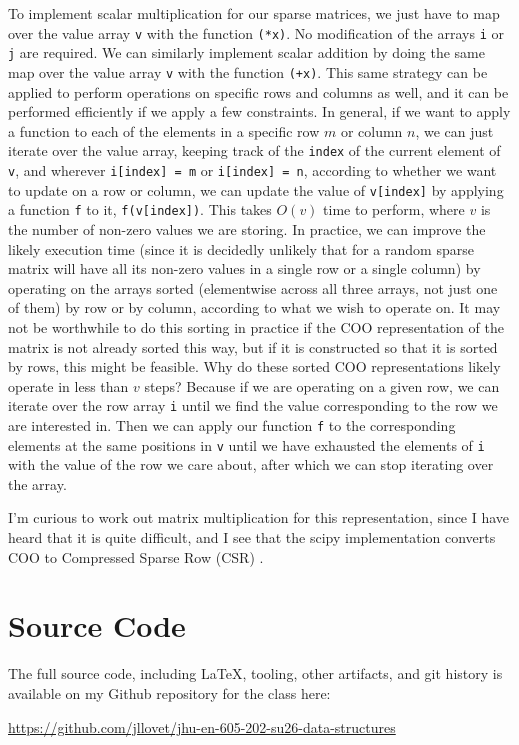 \documentclass[10pt,letterpaper,final]{report}
\begin{document}
To implement scalar multiplication for our sparse matrices, we just have to map over the value array \texttt{v} with the function \texttt{(*x)}. No modification of the arrays \texttt{i} or \texttt{j} are required. We can similarly implement scalar addition by doing the same map over the value array \texttt{v} with the function \texttt{(+x)}. This same strategy can be applied to perform operations on specific rows and columns as well, and it can be performed efficiently if we apply a few constraints. In general, if we want to apply a function to each of the elements in a specific row $m$ or column $n$, we can just iterate over the value array, keeping track of the \texttt{index} of the current element of \texttt{v}, and wherever \texttt{i[index] = m} or \texttt{i[index] = n}, according to whether we want to update on a row or column, we can update the value of  \texttt{v[index]} by applying a function \texttt{f} to it, \texttt{f(v[index])}. This takes $O(v)$ time to perform, where $v$ is the number of non-zero values we are storing. In practice, we can improve the likely execution time (since it is decidedly unlikely that for a random sparse matrix will have all its non-zero values in a single row or a single column) by operating on the arrays sorted (elementwise across all three arrays, not just one of them) by row or by column, according to what we wish to operate on. It may not be worthwhile to do this sorting in practice if the COO representation of the matrix is not already sorted this way, but if it is constructed so that it is sorted by rows, this might be feasible. Why do these sorted COO representations likely operate in less than $v$ steps? Because if we are operating on a given row, we can iterate over the row array \texttt{i} until we find the value corresponding to the row we are interested in. Then we can apply our function \texttt{f} to the corresponding elements at the same positions in \texttt{v} until we have exhausted the elements of \texttt{i} with the value of the row we care about, after which we can stop iterating over the array.

I'm curious to work out matrix multiplication for this representation, since I have heard that it is quite difficult, and I see that the scipy implementation converts COO to Compressed Sparse Row (CSR) \parencite{DocsnvidiacomSparseMatrixFormats} \parencite{GitHubScipyscipysparsebasepyAtV}.

\pagebreak

\section*{Source Code}
The full source code, including LaTeX, tooling, other artifacts, and git history is available on my Github repository for the class here:
\begin{center}
  \url{https://github.com/jllovet/jhu-en-605-202-su26-data-structures}
\end{center}

\printbibliography
\end{document}
